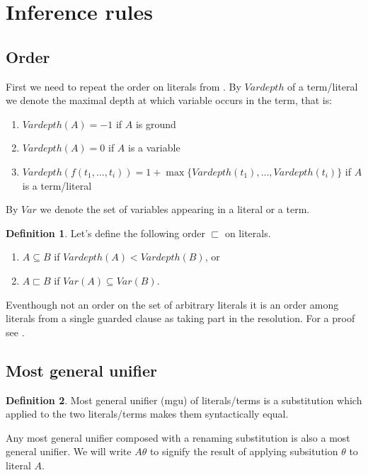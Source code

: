 \documentclass[english, shortabstract]{iithesis}
\theoremstyle{definition} \newtheorem{definition}{Definition}[chapter]
\theoremstyle{remark} \newtheorem{remark}[definition]{Observation}
\theoremstyle{plain} \newtheorem{theorem}[definition]{Theorem}
\theoremstyle{plain} \newtheorem{lemma}[definition]{Lemma}
\begin{document}
\section{Inference rules}

\subsection{Order}

First we need to repeat the order on literals from \cite{resolution gf}.
By $Vardepth$ of a term/literal we denote the maximal depth at which variable occurs in the term, that is:
\begin{enumerate}
    \item $Vardepth(A)=-1$ if $A$ is ground
    \item $Vardepth(A)=0$ if $A$ is a variable
    \item $Vardepth(f(t_1,\dots, t_i))=1+\max\{Vardepth(t_1), \dots, Vardepth(t_i)\}$ if $A$ is a term/literal
\end{enumerate}
By $Var$ we denote the set of variables appearing in a literal or a term.
\begin{definition}
Let's define the following order $\sqsubset$ on literals.
\begin{enumerate}
    \item $A \subseteq B$ if $Vardepth(A) < Vardepth(B)$, or
    \item $A \sqsubset B$ if $Var(A) \subseteq Var(B)$.
\end{enumerate}
\end{definition}
Eventhough not an order on the set of arbitrary literals it is an order among literals from a single guarded clause as taking part in the resolution.
For a proof see \cite{resolution gf}.

\subsection{Most general unifier}

\begin{definition}
Most general unifier (mgu) of literals/terms is a substitution which applied to the two literals/terms makes them syntactically equal. 
\end{definition}
Any most general unifier composed with a renaming substitution is also a most general unifier.
We will write $A\theta$ to signify the result of applying subsitution $\theta$ to literal $A$.
\end{document}
